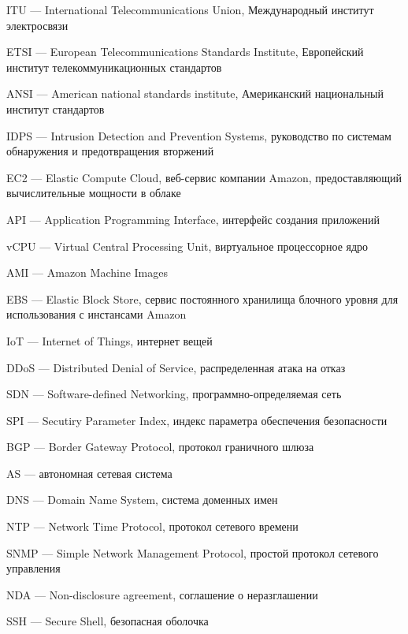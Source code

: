 \hypertarget{itu}{ITU --- International Telecommunications Union, Международный институт электросвязи}

\clearpage

\hypertarget{etsi}{ETSI --- European Telecommunications Standards Institute, Европейский институт телекоммуникационных стандартов}

\hypertarget{ansi}{ANSI --- American national standards institute, Американский национальный институт стандартов}

\hypertarget{idps}{IDPS --- Intrusion Detection and Prevention Systems, руководство по системам обнаружения и предотвращения вторжений}

\hypertarget{ec2}{EC2 --- Elastic Compute Cloud, веб-сервис компании Amazon, предоставляющий вычислительные мощности в облаке}

\hypertarget{api}{API --- Application Programming Interface, интерфейс создания приложений}

\hypertarget{vcpu}{vCPU --- Virtual Central Processing Unit, виртуальное процессорное ядро}

\hypertarget{ami}{AMI --- Amazon Machine Images}

\hypertarget{ebs}{EBS --- Elastic Block Store, сервис постоянного хранилища блочного уровня для использования с инстансами Amazon}

\hypertarget{iot}{IoT --- Internet of Things, интернет вещей}

\hypertarget{ddos}{DDoS --- Distributed Denial of Service, распределенная атака на отказ}

\hypertarget{sdn}{SDN --- Software-defined Networking, программно-определяемая сеть}

\hypertarget{spi}{SPI --- Secutiry Parameter Index, индекс параметра обеспечения безопасности}

\hypertarget{bgp}{BGP --- Border Gateway Protocol, протокол граничного шлюза}

\hypertarget{as}{AS --- автономная сетевая система}

\hypertarget{dns}{DNS --- Domain Name System, система доменных имен}

\hypertarget{ntp}{NTP --- Network Time Protocol, протокол сетевого времени}

\hypertarget{snmp}{SNMP --- Simple Network Management Protocol, простой протокол сетевого управления}

\hypertarget{nda}{NDA --- Non-disclosure agreement, соглашение о неразглашении}

\hypertarget{ssh}{SSH --- Secure Shell, безопасная оболочка}

